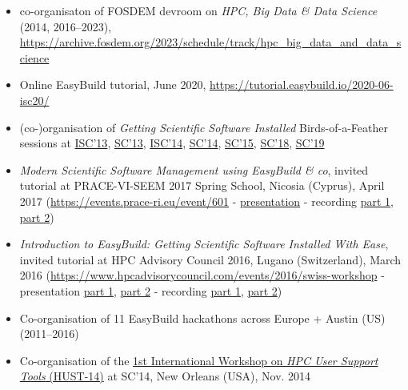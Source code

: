 \begin{itemize}
\item[] co-organisaton of FOSDEM devroom on \emph{HPC, Big Data \& Data Science} (2014, 2016--2023),
    \url{https://archive.fosdem.org/2023/schedule/track/hpc_big_data_and_data_science}
\item[] Online EasyBuild tutorial, June 2020, \url{https://tutorial.easybuild.io/2020-06-isc20/}
\item[] (co-)organisation of \emph{Getting Scientific Software Installed} Birds-of-a-Feather sessions at \href{http://2013.isc-hpc.com/isc13_ap/presentationdetails.php?t=contribution&o=2108&a=select&ra=eventdetails}{ISC'13}, \href{https://github.com/easybuilders/easybuild/wiki/SC13-BoF-session}{SC'13}, \href{https://github.com/easybuilders/easybuild/wiki/ISC'14-BoF-session}{ISC'14}, \href{https://github.com/easybuilders/easybuild/wiki/SC14-BoF-session}{SC'14}, \href{https://github.com/easybuilders/easybuild/wiki/SC15-BoF-session}{SC'15}, \href{https://github.com/easybuilders/easybuild/wiki/SC18-BoF-session-Getting-Scientific-Software-Installed}{SC'18}, \href{https://github.com/easybuilders/easybuild/wiki/SC19-BoF-session-Getting-Scientific-Software-Installed}{SC'19}
\item[] \emph{Modern Scientific Software Management using EasyBuild \& co}, invited tutorial at PRACE-VI-SEEM	2017 Spring School, Nicosia (Cyprus), April 2017 (\url{https://events.prace-ri.eu/event/601} - \href{https://users.ugent.be/~kehoste/EasyBuild_20170425_PRACE_Spring_School.pdf}{presentation} - recording \href{https://www.youtube.com/watch?v=5WNcTHRyDxk}{part 1}, \href{https://www.youtube.com/watch?v=fiv_p87w9XM}{part 2})
\item[] \emph{Introduction to EasyBuild: Getting Scientific Software Installed With Ease}, invited tutorial at HPC Advisory Council 2016, Lugano (Switzerland), March 2016 (\url{https://www.hpcadvisorycouncil.com/events/2016/swiss-workshop} - presentation \href{https://users.ugent.be/~kehoste/EasyBuild_HPCAC_intro_20160323.pdf}{part 1}, \href{https://users.ugent.be/~kehoste/EasyBuild_HPCAC_start_20160323.pdf}{part 2} - recording \href{https://www.youtube.com/watch?v=cL_UcPIIxzE}{part 1},  \href{https://www.youtube.com/watch?v=yo_KwlDtg0w}{part 2})
\item[] Co-organisation of 11 EasyBuild hackathons across Europe + Austin (US) (2011--2016)
\item[] Co-organisation of the \href{http://sc14.supercomputing.org/schedule/event_detail-evid=wksp152.html}{1st International Workshop on \emph{HPC User Support Tools} (HUST-14)} at SC'14, New Orleans (USA), Nov. 2014

\end{itemize}

